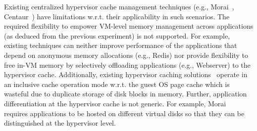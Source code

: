 %
Existing centralized hypervisor cache management 
techniques (e.g., Morai~\cite{sdc}, Centaur~\cite{centaur}) have
limitations w.r.t. their applicability in such scenarios.
%
The required flexibility to empower VM-level memory management across
applications (as deduced from the previous experiment) is not supported.
%
For example, existing techniques can neither improve performance of the 
applications that depend on anonymous memory allocations (e.g., Redis) 
nor provide flexibility to free in-VM memory by selectively offloading 
applications (e.g., Webserver) to the hypervisor cache.
%
Additionally, existing hypervisor caching solutions~\cite{sdc,centaur}
%
operate in an inclusive cache operation mode
w.r.t. the guest OS page cache which is wasteful due to duplicate 
storage of disk blocks in memory.
%
Further, application differentiation at the hypervisor cache is not
generic. For example, Morai~\cite{sdc} requires applications to be 
hosted on different virtual disks so that they can be distinguished at the
hypervisor level.
%

